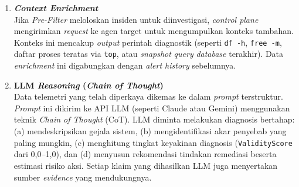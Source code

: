 \begin{enumerate}[label=\arabic*., leftmargin=*]
  \item \textbf{\textit{Context Enrichment}}\\
        Jika \textit{Pre-Filter} meloloskan insiden untuk diinvestigasi, \textit{control plane} mengirimkan \textit{request} ke agen target untuk mengumpulkan konteks tambahan. Konteks ini mencakup \textit{output} perintah diagnostik (seperti \texttt{df -h}, \texttt{free -m}, daftar proses teratas via \texttt{top}, atau \textit{snapshot} \textit{query} \textit{database} terakhir). Data \textit{enrichment} ini digabungkan dengan \textit{alert history} sebelumnya.

  \item \textbf{LLM \textit{Reasoning} (\textit{Chain of Thought})}\\
        Data telemetri yang telah diperkaya dikemas ke dalam \textit{prompt} terstruktur. \textit{Prompt} ini dikirim ke API LLM (seperti Claude atau Gemini) menggunakan teknik \textit{Chain of Thought} (CoT). LLM diminta melakukan diagnosis bertahap: (a) mendeskripsikan gejala sistem, (b) mengidentifikasi akar penyebab yang paling mungkin, (c) menghitung tingkat keyakinan diagnosis (\texttt{ValidityScore} dari 0,0--1,0), dan (d) menyusun rekomendasi tindakan remediasi beserta estimasi risiko aksi. Setiap klaim yang dihasilkan LLM juga menyertakan sumber \textit{evidence} yang mendukungnya.


\end{enumerate}
